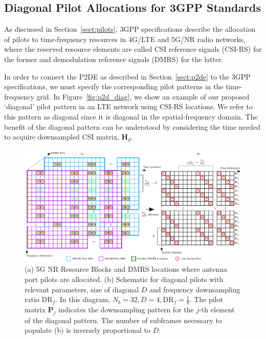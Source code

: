 \subsection{Diagonal Pilot Allocations for 3GPP Standards} \label{sect:diag}

As discussed in Section~\ref{sect:pilots}, 3GPP specifications describe the allocation of pilots to time-frequency resources in 4G/LTE \cite{ref:3gpp.36.211, ref:Asplund2020} and 5G/NR \cite{ref:3GPPTS38.211V15.8.0} radio networks, where the reserved resource elements are called CSI reference signals (CSI-RS) for the former and demodulation reference signals (DMRS) for the latter.

In order to connect the P2DE as described in Section~\ref{sect:p2de} to the 3GPP specifications, we must specify the corresponding pilot patterns in the time-frequency grid. In Figure~\ref{fig:p2d_diag}, we show an example of our proposed `diagonal' pilot pattern in an LTE network using CSI-RS locations. We refer to this pattern as diagonal since it is diagonal in the spatial-frequency domain. The benefit of the diagonal pattern can be understood by considering the time needed to acquire downsampled CSI matrix, $\mathbf{H}_d$.

\begin{figure}[!hbtp]
    \centering
    \includegraphics[width=\linewidth]{images/03_p2d_pilots_diag_with_resource_grid_5gnr_ortho.png}
    \caption{(a) 5G NR Resource Blocks and DMRS locations where antenna port pilots are allocated. (b) Schematic for diagonal pilots with relevant parameters, size of diagonal $D$ and frequency downsampling ratio $\text{DR}_f$. In this diagram, $N_b=32, D=4, \text{DR}_f=\frac 18$. The pilot matrix $\mathbf{P}_j$ indicates the downsampling pattern for the $j$-th element of the diagonal pattern. The number of subframes necessary to populate (b) is inversely proportional to $D$.}
    \label{fig:p2d_diag_5gnr}
\end{figure}

